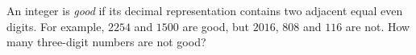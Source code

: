 An integer is \emph{good} if its decimal representation contains two adjacent equal even digits. For example, $2254$ and $1500$ are good, but $2016$, $808$ and $116$ are not. How many three-digit numbers are not good?
